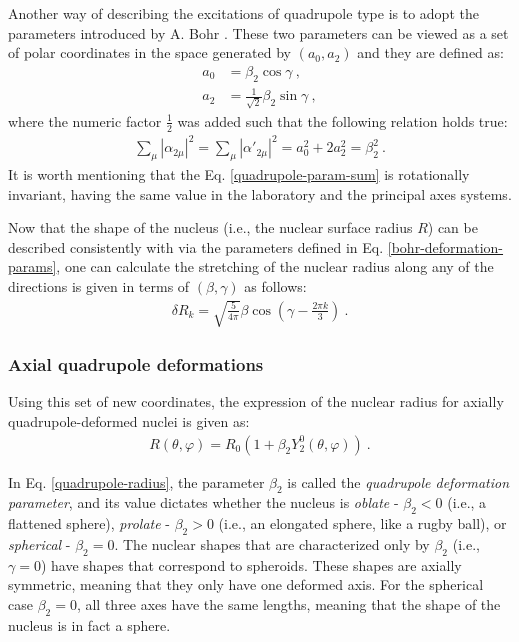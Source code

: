 Another way of describing the excitations of quadrupole type is to adopt the parameters introduced by A. Bohr \cite{bohr1954rotational}. These two parameters can be viewed as a set of polar coordinates in the space generated by $(a_0,a_2)$ and they are defined as:
\begin{align}
    a_0&=\beta_2\cos\gamma\ , \nonumber \\
    a_2&=\frac{1}{\sqrt{2}}\beta_2\sin\gamma\ , \label{bohr-deformation-params}
\end{align}
where the numeric factor $\frac{1}{2}$ was added such that the following relation holds true:
\begin{align}
    \sum_\mu\left|\alpha_{2\mu}\right|^2=\sum_\mu\left|\alpha'_{2\mu}\right|^2=a_0^2+2a_2^2=\beta_2^2\ .
    \label{quadrupole-param-sum}
\end{align}
It is worth mentioning that the Eq. \ref{quadrupole-param-sum} is rotationally invariant, having the same value in the laboratory and the principal axes systems.

Now that the shape of the nucleus (i.e., the nuclear surface radius $R$) can be described consistently with via the parameters defined in Eq. \ref{bohr-deformation-params}, one can calculate the stretching of the nuclear radius along any of the directions is given in terms of $(\beta,\gamma)$ as follows:
\begin{align}
    \delta R_k=\sqrt{\frac{5}{4\pi}}\beta\cos(\gamma-\frac{2\pi k}{3})\ .
\end{align}

\subsubsection{Axial quadrupole deformations}

Using this set of new coordinates, the expression of the nuclear radius for axially quadrupole-deformed nuclei is given as:
\begin{align}
    R(\theta,\varphi)=R_0\left(1+\beta_2 Y_2^0(\theta,\varphi)\right)\ . \label{quadrupole-radius}
\end{align}

In Eq. \ref{quadrupole-radius}, the parameter $\beta_2$ is called the \emph{quadrupole deformation parameter}, and its value dictates whether the nucleus is \emph{oblate} - $\beta_2<0$ (i.e., a flattened sphere), \emph{prolate} - $\beta_2>0$ (i.e., an elongated sphere, like a rugby ball), or \emph{spherical} - $\beta_2=0$.  The nuclear shapes that are characterized only by $\beta_2$ (i.e., $\gamma=0$) have shapes that correspond to spheroids. These shapes are axially symmetric, meaning that they only have one deformed axis. For the spherical case $\beta_2=0$, all three axes have the same lengths, meaning that the shape of the nucleus is in fact a sphere.


